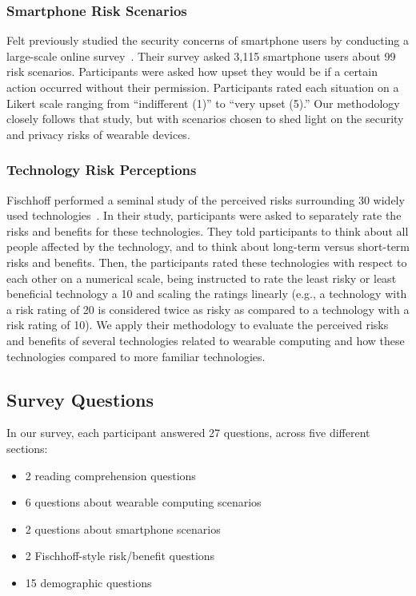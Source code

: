 \subsubsection{Smartphone Risk Scenarios}
Felt \etal previously studied the security concerns of smartphone users by conducting a large-scale online survey~\cite{Felt}. Their survey asked 3,115 smartphone users about 99 risk scenarios. Participants were asked how upset they would be if a certain action occurred without their permission. Participants rated each situation on a Likert scale ranging from ``indifferent (1)'' to ``very upset (5).''
Our methodology closely follows that study, but with scenarios chosen to shed light on the security and privacy risks of wearable devices.

\subsubsection{Technology Risk Perceptions}
Fischhoff \etal performed a seminal study of the perceived risks surrounding 30 widely used technologies~\cite{Fischhoff}. In their study, participants were asked to separately rate the risks and benefits for these technologies. They told participants to think about all people affected by the technology, and to think about long-term versus short-term risks and benefits. Then, the participants rated these technologies with respect to each other on a numerical scale, being instructed to rate the least risky or least beneficial technology a 10 and scaling the ratings linearly (e.g., a technology with a risk rating of 20 is considered twice as risky as compared to a technology with a risk rating of 10). We apply their methodology to evaluate the perceived risks and benefits of several technologies related to wearable computing and how these technologies compared to more familiar technologies.

\subsection{Survey Questions}
In our survey, each participant answered 27 questions, across five different sections:   \\[-.8cm]

\begin{itemize} \itemsep1pt \parskip0pt 
\item 2 reading comprehension questions
\item 6 questions about wearable computing scenarios 
\item 2 questions about smartphone scenarios 
\item 2 Fischhoff-style risk/benefit questions 
\item 15 demographic questions \\[-.8cm]
\end{itemize}

